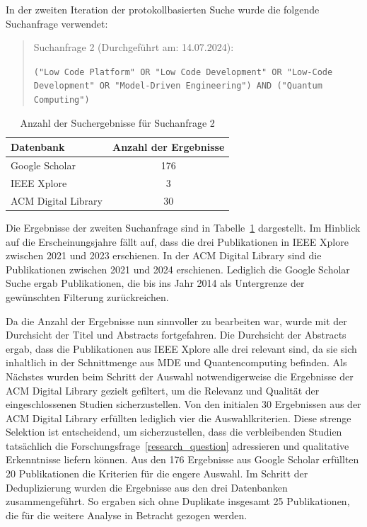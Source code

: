 In der zweiten Iteration der protokollbasierten Suche wurde die folgende Suchanfrage verwendet:

\begin{quote}
    Suchanfrage 2 (Durchgeführt am: 14.07.2024):

    \texttt{("Low Code Platform" OR "Low Code Development" OR "Low-Code Development" OR "Model-Driven Engineering") AND ("Quantum Computing")}

\end{quote}

\begin{table}[h!]
    \centering
    \caption{Anzahl der Suchergebnisse für Suchanfrage 2}
    \label{tab:search_2_results}
    \begin{tabular}{|l|c|}
    \hline
    \textbf{Datenbank} & \textbf{Anzahl der Ergebnisse} \\ \hline
    Google Scholar & 176 \\ \hline
    IEEE Xplore & 3 \\ \hline
    ACM Digital Library & 30 \\ \hline
    \end{tabular}
\end{table}

Die Ergebnisse der zweiten Suchanfrage sind in Tabelle~\ref{tab:search_2_results} dargestellt. Im Hinblick auf die Erscheinungsjahre fällt auf, dass 
die drei Publikationen in IEEE Xplore zwischen 2021 und 2023 erschienen. In der ACM Digital Library sind die Publikationen zwischen 2021 und 2024 erschienen. 
Lediglich die Google Scholar Suche ergab Publikationen, die bis ins Jahr 2014 als Untergrenze der gewünschten Filterung zurückreichen. 

Da die Anzahl der Ergebnisse nun sinnvoller zu bearbeiten war, wurde mit der Durchsicht der Titel und Abstracts fortgefahren. 
Die Durchsicht der Abstracts ergab, dass die Publikationen aus IEEE Xplore alle drei relevant sind, da sie sich inhaltlich in der 
Schnittmenge aus MDE und Quantencomputing befinden. Als Nächstes wurden beim Schritt der Auswahl notwendigerweise die 
Ergebnisse der ACM Digital Library gezielt gefiltert, um die Relevanz und Qualität der eingeschlossenen Studien sicherzustellen. 
Von den initialen 30 Ergebnissen aus der ACM Digital Library erfüllten lediglich vier die Auswahlkriterien. Diese strenge Selektion ist entscheidend, um 
sicherzustellen, dass die verbleibenden Studien tatsächlich die Forschungsfrage~\ref{research_question} adressieren und qualitative Erkenntnisse liefern können. 
Aus den 176 Ergebnisse aus Google Scholar erfüllten 20 Publikationen die Kriterien für die engere Auswahl. 
Im Schritt der Deduplizierung wurden die Ergebnisse aus den drei Datenbanken zusammengeführt. 
So ergaben sich ohne Duplikate insgesamt 25 Publikationen, die für die weitere Analyse in Betracht gezogen werden. 


